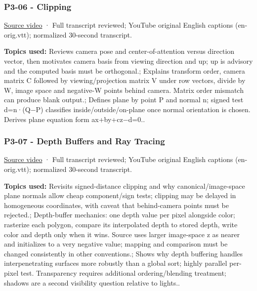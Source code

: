 \subsubsection{P3-06 - Clipping}\label{04-visual-computing-ii-ch036-p3-06---clipping}

\hypertarget{04-visual-computing-ii-ch036-p3-06---clipping}{}

\href{https://www.youtube.com/watch?v=og7hOFypKpQ}{Source video} · Full transcript reviewed; YouTube original English captions (en-orig.vtt); normalized 30-second transcript.

\textbf{Topics used:} Reviews camera pose and center-of-attention versus direction vector, then motivates camera basis from viewing direction and up; up is advisory and the computed basis must be orthogonal.; Explains transform order, camera matrix C followed by viewing/projection matrix V under row vectors, divide by W, image space and negative-W points behind camera. Matrix order mismatch can produce blank output.; Defines plane by point P and normal n; signed test d=n·(Q−P) classifies inside/outside/on-plane once normal orientation is chosen. Derives plane equation form ax+by+cz−d=0..

\subsubsection{P3-07 - Depth Buffers and Ray Tracing}\label{04-visual-computing-ii-ch036-p3-07---depth-buffers-and-ray-tracing}

\hypertarget{04-visual-computing-ii-ch036-p3-07---depth-buffers-and-ray-tracing}{}

\href{https://www.youtube.com/watch?v=Xks1v4GNUiY}{Source video} · Full transcript reviewed; YouTube original English captions (en-orig.vtt); normalized 30-second transcript.

\textbf{Topics used:} Revisits signed-distance clipping and why canonical/image-space plane normals allow cheap component/sign tests; clipping may be delayed in homogeneous coordinates, with caveat that behind-camera points must be rejected.; Depth-buffer mechanics: one depth value per pixel alongside color; rasterize each polygon, compare its interpolated depth to stored depth, write color and depth only when it wins. Source uses larger image-space z as nearer and initializes to a very negative value; mapping and comparison must be changed consistently in other conventions.; Shows why depth buffering handles interpenetrating surfaces more robustly than a global sort; highly parallel per-pixel test. Transparency requires additional ordering/blending treatment; shadows are a second visibility question relative to lights..

